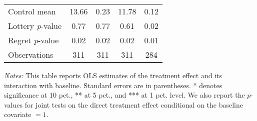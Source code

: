 \begin{table}[htbp]
{\begin{threeparttable}
\begin{tabular}{l*{4}{c}}
Control mean    &    13.66         &     0.23         &    11.78         &     0.12         \\
Lottery \emph{p}-value&     0.77         &     0.77         &     0.61         &     0.02         \\
Regret \emph{p}-value&     0.02         &     0.02         &     0.02         &     0.01         \\
Observations    &      311         &      311         &      311         &      284         \\
\bottomrule \end{tabular} \begin{tablenotes}[flushleft] \footnotesize \item \emph{Notes:} This table reports OLS estimates of the treatment effect and its interaction with baseline. Standard errors are in parentheses. * denotes significance at 10 pct., ** at 5 pct., and *** at 1 pct. level. We also report the \(p\)-values for joint tests on the direct treatment effect conditional on the baseline covariate $= 1$. \end{tablenotes} \end{threeparttable} } \end{table}

